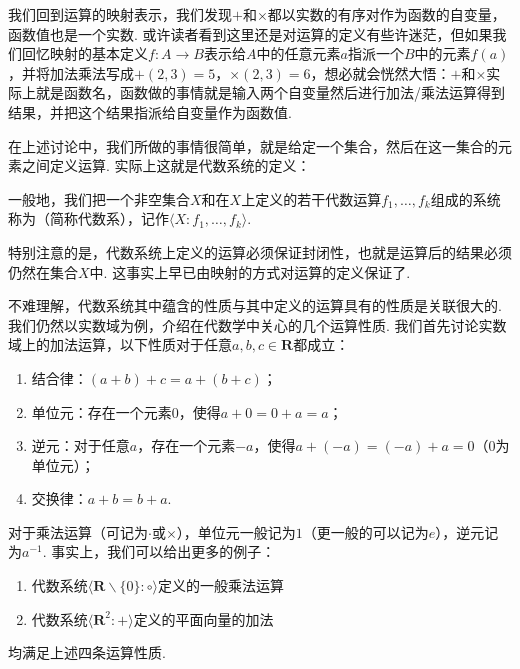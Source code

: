 我们回到运算的映射表示，我们发现$+$和$\times$都以实数的有序对作为函数的自变量，函数值也是一个实数. 或许读者看到这里还是对运算的定义有些许迷茫，但如果我们回忆映射的基本定义$f:A\to B$表示给$A$中的任意元素$a$指派一个$B$中的元素$f(a)$，并将加法乘法写成$+(2,3)=5$，$\times(2,3)=6$，想必就会恍然大悟：$+$和$\times$实际上就是函数名，函数做的事情就是输入两个自变量然后进行加法/乘法运算得到结果，并把这个结果指派给自变量作为函数值.

在上述讨论中，我们所做的事情很简单，就是给定一个集合，然后在这一集合的元素之间定义运算. 实际上这就是代数系统的定义：
\begin{definition}[代数系统] 
    一般地，我们把一个非空集合$X$和在$X$上定义的若干代数运算$f_1,\ldots,f_k$组成的系统称为（简称代数系），记作$\langle X : f_1,\ldots,f_k\rangle$.
\end{definition}

特别注意的是，代数系统上定义的运算必须保证封闭性，也就是运算后的结果必须仍然在集合$X$中. 这事实上早已由映射的方式对运算的定义保证了.

不难理解，代数系统其中蕴含的性质与其中定义的运算具有的性质是关联很大的. 我们仍然以实数域为例，介绍在代数学中关心的几个运算性质. 我们首先讨论实数域上的加法运算，以下性质对于任意$a,b,c\in\mathbf{R}$都成立：

\begin{enumerate}
    \item 结合律：$(a+b)+c=a+(b+c)$；

    \item 单位元：存在一个元素$0$，使得$a+0=0+a=a$；

    \item 逆元：对于任意$a$，存在一个元素$-a$，使得$a+(-a)=(-a)+a=0$（0为单位元）；

    \item 交换律：$a+b=b+a$.
\end{enumerate}

对于乘法运算（可记为$\cdot$或$\times$），单位元一般记为$1$（更一般的可以记为$e$），逆元记为$a^{-1}$. 事实上，我们可以给出更多的例子：
\begin{example}\label{ex:1:Abel 群}
    \begin{enumerate}
        \item 代数系统$\langle \mathbf{R}\backslash\{0\}:\circ\rangle$定义的一般乘法运算

        \item 代数系统$\langle \mathbf{R}^2:+\rangle$定义的平面向量的加法
    \end{enumerate}
    均满足上述四条运算性质.
\end{example}

